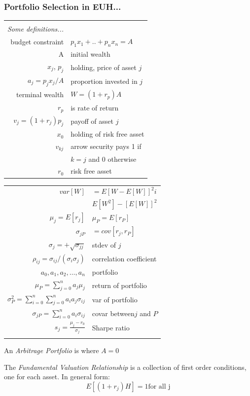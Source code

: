 \documentclass[a4paper,12pt]{article}
\begin{document}
\begin{multicols}{2}
\subsubsection*{Portfolio Selection in EUH...}

\begin{tabular}{rl}
&\\
\emph{Some definitions...}&\\
budget constraint& $p_1x_1+..+p_nx_n=A$\\
A &initial wealth\\
$x_j$, $p_j$&holding, price of asset $j$\\
$a_j=p_jx_j/A$& proportion invested in $j$\\
terminal wealth& $W = (1 + r_p)A$\\
$r_p$& is rate of return  \\
$v_j=(1+r_j)p_j$ & payoff of asset $j$\\
$x_0$&holding of risk free asset\\
$v_{kj}$& arrow security pays 1 if\\
&$k=j$ and 0 otherwise\\
$r_0$&risk free asset\\
\end{tabular}
\begin{tabular}{rl}
$var[W]$&$=E[W-E[W]]^2i$\\
        &$E[W^2]-[E[W]]^2$\\
$\mu_j=E[r_j]$&$\mu_P=E[r_P]$\\
$\sigma_{jP}$&$=cov[r_j,r_P]$\\
$\sigma_j=+\sqrt{\sigma_{jj}}$&stdev of $j$\\
$\rho_{ij}=\sigma_{ij}/(\sigma_i\sigma_j)$& correlation coefficient\\
$a_0,a_1,a_2,\ldots,a_n$&portfolio\\
$\mu_P=\sum^n_{j=0}a_j\mu_j$&return of portfolio\\
$\sigma^2_P=\sum^n_{i=0}\sum^n_{j=0}a_ia_j\sigma_{ij}$&var of portfolio\\
$\sigma_{jP}=\sum^n_{i=0}a_i\sigma_{ij}$&covar between$j$ and $P$\\
$s_j=\frac{\mu_j-r_0}{\sigma_j}$& Sharpe ratio\\
&\\
\end{tabular}

An \emph{Arbitrage Portfolio} is where $A = 0$

The \emph{Fundamental Valuation Relationship} is a collection of first order
conditions, one for each asset. In general form: \[E[(1+r_j)H]=1 \mbox{for all
j}\]


\end{multicols}
\end{document}
